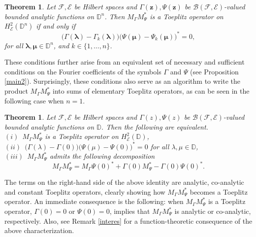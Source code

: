\documentclass[12pt]{amsart}
\newtheorem{thm}[propn]{Theorem}
\theoremstyle{definition}
\newcommand{\D}{\mathbb{D}}
\newcommand{\1}{{\mbox{\bf 1}}}
\newcommand{\clb}{\mathcal{B}}
\newcommand{\cle}{\mathcal{E}}
\newcommand{\clf}{\mathcal{F}}
\begin{document}
\begin{thm}\label{prod_mains}
Let $\clf, \cle$ be Hilbert spaces and $\Gamma(\bm{z}), \Psi(\bm{z})$ be $\clb(\clf,\cle)$-valued bounded analytic functions on $\D^n$. Then $M_{\Gamma}M_{\Psi}^*$ is a Toeplitz operator on $H_{\cle}^2(\D^n)$ if and only if 
\[
\big( \Gamma(\bm{\lambda}) - \Gamma_k(\bm{\lambda}) \big) \big( \Psi(\bm{\mu}) - \Psi_k(\bm{\mu})\big)^* = 0,
\]
for all $\bm{\lambda}, \bm{\mu} \in \D^n$, and $k \in \{1,\ldots,n\}$. 

\end{thm}
These conditions further arise from an equivalent set of necessary and sufficient conditions on the Fourier coefficients of the symbols $\Gamma$ and $\Psi$ (see Proposition \ref{main2}). Surprisingly, these conditions also serve as an algorithm to write the product $M_{\Gamma} M_{\Psi}^*$ into sums of elementary Toeplitz operators,  as can be seen in the following case when $n=1$.
\begin{thm}\label{simple}
Let $\clf, \cle$ be Hilbert spaces and $\Gamma(z), \Psi(z)$ be $\clb(\clf,\cle)$-valued bounded analytic functions on $\D$. Then the following are equivalent.\\ \vspace{1mm}
$(i)$~$M_{\Gamma}M_{\Psi}^*$ is a Toeplitz operator on $H_{\cle}^2(\D)$,\\ \vspace{1mm}
$(ii)$~$\big( \Gamma(\lambda) - \Gamma(0) \big) \big( \Psi(\mu) - \Psi(0) \big)^* = 0$ for all $\lambda, \mu \in \D$,\\ \vspace{1mm}
$(iii)$~$M_{\Gamma}M_{\Psi}^*$ admits the following decomposition
\[
M_{\Gamma}M_{\Psi}^*  = M_{\Gamma} \Psi(0)^* + \Gamma(0) M_{\Psi}^* - \Gamma(0) \Psi(0)^*.
\]
\end{thm}
The terms on the right-hand side of the above identity are analytic, co-analytic and constant Toeplitz operators, clearly showing how $M_{\Gamma} M_{\Psi}^*$ becomes a Toeplitz operator. An immediate consequence is the following: \textsf{when $M_{\Gamma} M_{\Psi}^*$ is a Toeplitz operator, $\Gamma(0)=0$ or $\Psi(0)=0$, implies that $M_{\Gamma} M_{\Psi}^*$ is analytic or co-analytic, respectively}.  Also, see Remark \ref{interes} for a function-theoretic consequence of the above characterization.
\end{document}
